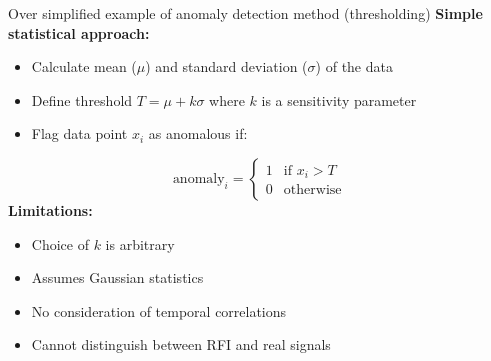 \documentclass[aspectratio=169]{beamer}
\begin{document}
\begin{frame}{Over simplified example of anomaly detection method (thresholding)}
  \footnotesize
  \textbf{Simple statistical approach:}
  \begin{itemize}
    \item Calculate mean ($\mu$) and standard deviation ($\sigma$) of the data
    \item Define threshold $T = \mu + k\sigma$ where $k$ is a sensitivity parameter
    \item Flag data point $x_i$ as anomalous if:
  \end{itemize}
  \begin{equation}
    \text{anomaly}_i = \begin{cases}
      1 & \text{if } x_i > T \\
      0 & \text{otherwise}
    \end{cases}
  \end{equation}
  \textbf{Limitations:}
  \begin{itemize}
    \item Choice of $k$ is arbitrary
    \item Assumes Gaussian statistics
    \item No consideration of temporal correlations
    \item Cannot distinguish between RFI and real signals
  \end{itemize}
\end{frame}
\end{document}
